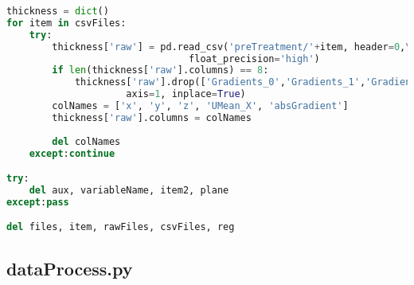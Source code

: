 \begin{lstlisting}[language=python]
thickness = dict()
for item in csvFiles:
    try:
        thickness['raw'] = pd.read_csv('preTreatment/'+item, header=0,\
                                float_precision='high')
        if len(thickness['raw'].columns) == 8:
            thickness['raw'].drop(['Gradients_0','Gradients_1','Gradients_2'],\
                     axis=1, inplace=True)
        colNames = ['x', 'y', 'z', 'UMean_X', 'absGradient']
        thickness['raw'].columns = colNames
        
        del colNames
    except:continue

try:
    del aux, variableName, item2, plane
except:pass

del files, item, rawFiles, csvFiles, reg

\end{lstlisting}

\subsection{dataProcess.py}
